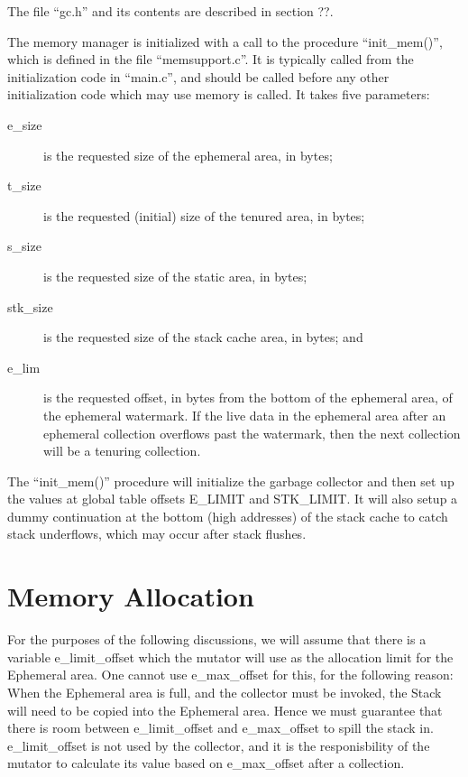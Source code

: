 The file ``gc.h'' and its contents are described in section ??.

The memory manager is initialized with a call to the procedure ``init\_mem()'',
which is defined in the file ``memsupport.c''. It is typically called from
the initialization code in ``main.c'', and should be called before any other
initialization code which may use memory is called. It takes five parameters:

\begin{description}
\item[e\_size] is the requested size of the ephemeral area, in bytes;
\item[t\_size] is the requested (initial) size of the tenured area, in bytes;
\item[s\_size] is the requested size of the static area, in bytes;
\item[stk\_size] is the requested size of the stack cache area, in bytes; and
\item[e\_lim] is the requested offset, in bytes from the bottom of the
  ephemeral area, of the ephemeral watermark. If the live data in the
  ephemeral area after an ephemeral collection overflows past the
  watermark, then the next collection will be a tenuring collection.
\end{description}

The ``init\_mem()'' procedure will initialize the garbage collector and then
set up the values at global table offsets E\_LIMIT and STK\_LIMIT. It will
also setup a dummy continuation at the bottom (high addresses) of the
stack cache to catch stack underflows, which may occur after stack flushes.


\section{Memory Allocation}

For the purposes of the following discussions, we will assume that there
is a variable {\sc e\_limit\_offset} which the mutator will use as the allocation
limit for the Ephemeral area. One cannot use {\sc e\_max\_offset} for this, for the
following reason: When the Ephemeral area is full, and the collector
must be invoked, the Stack will need to be copied into the Ephemeral area.
Hence we must guarantee that there is room between {\sc e\_limit\_offset} and
{\sc e\_max\_offset} to spill the stack in. {\sc e\_limit\_offset} is not used by the
collector, and it is the responisbility of the mutator to calculate
its value based on {\sc e\_max\_offset} after a collection.

